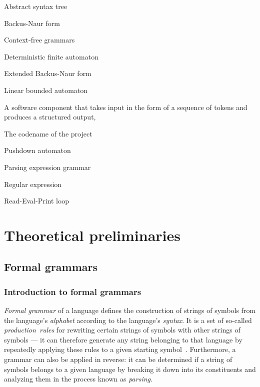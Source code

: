 \documentclass[english,bachelors,forcepolishlogotype]{wizthesis}
\newcommand{\thisproject}{Parser-parser}
\begin{document}
\begin{description}[leftmargin=!,labelwidth=2.5cm]
  \item[AST] Abstract syntax tree
  \item[BNF] Backus-Naur form
  \item[CFG] Context-free grammars
  \item[DFA] Deterministic finite automaton
  \item[EBNF] Extended Backus-Naur form
  \item[LBA] Linear bounded automaton
  \item[Parser] A software component that takes input in the form of a sequence
  of tokens and produces a structured output,
  \item[\thisproject{}] The codename of the project
  \item[PDA] Pushdown automaton
  \item[PEG] Parsing expression grammar
  \item[RE] Regular expression
  \item[REPL] Read-Eval-Print loop
\end{description}

\chapter{Theoretical preliminaries} \label{ch:theoretical-preliminaries}

\section{Formal grammars}

\subsection{Introduction to formal grammars}

\emph{Formal grammar} of a language defines the construction of strings of
symbols from the language's \emph{alphabet} according to the language's
\emph{syntax}. It is a set of so-called \emph{production~rules} for
rewriting certain strings of symbols with other strings of symbols --- it can
therefore generate any string belonging to that language by repeatedly applying
these rules to a given starting symbol~\cite{meduna-2014}. Furthermore, a
grammar can also be applied in reverse: it can be determined if a string of
symbols belongs to a given language by breaking it down into its constituents
and analyzing them in the process known as \emph{parsing}.
\end{document}
